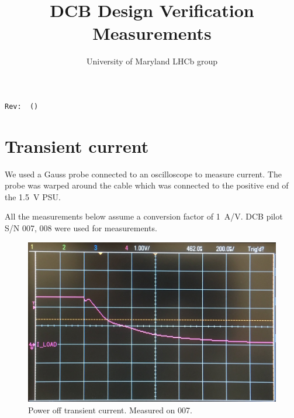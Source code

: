 \documentclass[11pt,letterpaper]{refart}
\title{DCB Design Verification Measurements}
\author{University of Maryland LHCb group}
\begin{document}
\maketitle
\hfill\small{\texttt{Rev:~\gitRel~(\gitAbbrevHash)}}
\tableofcontents
\listoffigures


\section{Transient current}
We used a Gauss probe connected to an oscilloscope to measure current.
The probe was warped around the cable which was connected to the positive end of
the \SI{1.5}{\volt} PSU.

All the measurements below assume a conversion factor of \SI{1}{\ampere/\volt}.
DCB pilot S/N 007, 008 were used for measurements.

\begin{figure}[ht]
    \centering
    \includegraphics[width=0.8\linewidth]{./res/current_transient/power_off.jpg}
    \caption[Power off transient current]{
        Power off transient current. Measured on 007.
    }
\end{figure}
\end{document}
